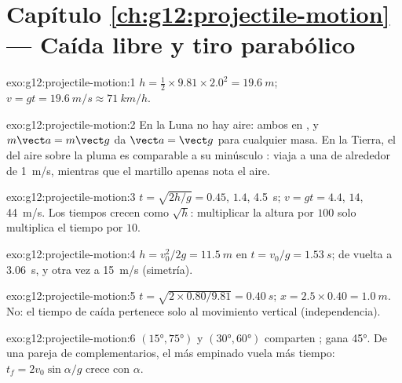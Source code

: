\section*{Capítulo \ref{ch:g12:projectile-motion} --- Caída libre y tiro parabólico}

\begin{solution}{exo:g12:projectile-motion:1}
$h = \tfrac12 \times 9.81 \times 2.0^2 = \qty{19.6}{m}$;
$v = gt = \qty{19.6}{m/s} \approx \qty{71}{km/h}$.
\end{solution}

\begin{solution}{exo:g12:projectile-motion:2}
En la Luna no hay aire: ambos en , y $m\vect a = m\vect g$ da
$\vect a = \vect g$ para cualquier masa. En la Tierra, el  del
aire sobre la pluma es comparable a su minúsculo : viaja a una
 de alrededor de \qty{1}{m/s}, mientras que el martillo
apenas nota el aire.
\end{solution}

\begin{solution}{exo:g12:projectile-motion:3}
$t = \sqrt{2h/g} = 0.45$, $1.4$, \qty{4.5}{s}; $v = gt = 4.4$, $14$,
\qty{44}{m/s}. Los tiempos crecen como $\sqrt h$: multiplicar la altura
por $100$ solo multiplica el tiempo por $10$.
\end{solution}

\begin{solution}{exo:g12:projectile-motion:4}
$h = v_0^2/2g = \qty{11.5}{m}$ en $t = v_0/g = \qty{1.53}{s}$; de vuelta
a \qty{3.06}{s}, y otra vez a \qty{15}{m/s} (simetría).
\end{solution}

\begin{solution}{exo:g12:projectile-motion:5}
$t = \sqrt{2 \times 0.80/9.81} = \qty{0.40}{s}$;
$x = 2.5 \times 0.40 = \qty{1.0}{m}$. No: el tiempo de caída pertenece
solo al movimiento vertical (independencia).
\end{solution}

\begin{solution}{exo:g12:projectile-motion:6}
$(\ang{15},\ang{75})$ y $(\ang{30},\ang{60})$ comparten ; gana
\ang{45}. De una pareja de complementarios, el más empinado vuela más
tiempo: $t_f = 2v_0\sin\alpha/g$ crece con $\alpha$.
\end{solution}

